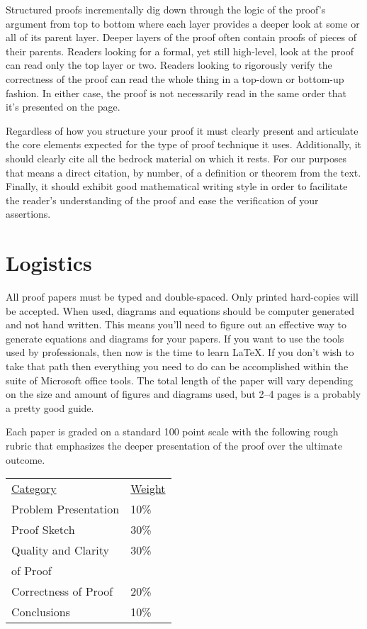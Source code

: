 \documentclass{tufte-handout}
\begin{document}
Structured proofs incrementally dig down through the logic of the proof's argument from top to bottom where each layer provides a deeper look at some or all of its parent layer. Deeper layers of the proof often contain proofs of pieces of their parents. Readers looking for a formal, yet still high-level, look at the proof can read only the top layer or two.  Readers looking to rigorously verify the correctness of the proof can read the whole thing in a top-down or bottom-up fashion. In either case, the proof is not necessarily read in the same order that it's presented on the page.

Regardless of how you structure your proof it must clearly present and articulate the core elements expected for the type of proof technique it uses. Additionally, it should clearly cite all the bedrock material on which it rests.  For our purposes that means a direct citation, by number, of a definition or theorem from the text. Finally, it should exhibit good mathematical writing style in order to facilitate the reader's understanding of the proof and ease the verification of your assertions.

\section{Logistics}

All proof papers must be typed and double-spaced. Only printed hard-copies will be accepted. When used, diagrams and equations should be computer generated and not hand written. This means you'll need to figure out an effective way to generate equations and diagrams for your papers.  If you want to use the tools used by professionals, then now is the time to learn \LaTeX. If you don't wish to take that path then everything you need to do can be accomplished within the suite of Microsoft office tools. The total length of the paper will vary depending on the size and amount of figures and diagrams used, but 2--4 pages is a probably a pretty good guide.

Each paper is graded on a standard 100 point scale with the following rough rubric that emphasizes the deeper presentation of the proof over the ultimate outcome.

\begin{center}
  \begin{tabular}{ll}
    \underline{Category} & \underline{Weight} \\
      Problem Presentation & 10\% \\
      Proof Sketch & 30\% \\
      Quality and Clarity & 30\% \\
      of Proof \\
      Correctness of Proof & 20\% \\
      Conclusions & 10\%
  \end{tabular}
\end{center}
\end{document}
